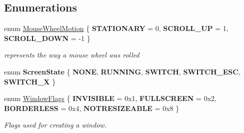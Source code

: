 \subsection*{Enumerations}
\begin{DoxyCompactItemize}
\item 
\mbox{\label{namespacenta_aabafd53ba7264997db9e6e934a8ade2b}} 
enum \hyperlink{namespacenta_aabafd53ba7264997db9e6e934a8ade2b}{Mouse\+Wheel\+Motion} \{ {\bfseries S\+T\+A\+T\+I\+O\+N\+A\+RY} = 0, 
{\bfseries S\+C\+R\+O\+L\+L\+\_\+\+UP} = 1, 
{\bfseries S\+C\+R\+O\+L\+L\+\_\+\+D\+O\+WN} = -\/1
 \}\begin{DoxyCompactList}\small\item\em represents the way a mouse wheel was rolled \end{DoxyCompactList}
\item 
\mbox{\label{namespacenta_a784064b76630398da451dbeffdfc5ad2}} 
enum {\bfseries Screen\+State} \{ \newline
{\bfseries N\+O\+NE}, 
{\bfseries R\+U\+N\+N\+I\+NG}, 
{\bfseries S\+W\+I\+T\+CH}, 
{\bfseries S\+W\+I\+T\+C\+H\+\_\+\+E\+SC}, 
\newline
{\bfseries S\+W\+I\+T\+C\+H\+\_\+X}
 \}
\item 
\mbox{\label{namespacenta_a49cf148a7560d323486d7947b79a43b8}} 
enum \hyperlink{namespacenta_a49cf148a7560d323486d7947b79a43b8}{Window\+Flags} \{ {\bfseries I\+N\+V\+I\+S\+I\+B\+LE} = 0x1, 
{\bfseries F\+U\+L\+L\+S\+C\+R\+E\+EN} = 0x2, 
{\bfseries B\+O\+R\+D\+E\+R\+L\+E\+SS} = 0x4, 
{\bfseries N\+O\+T\+R\+E\+S\+I\+Z\+E\+A\+B\+LE} = 0x8
 \}\begin{DoxyCompactList}\small\item\em Flags used for creating a window. \end{DoxyCompactList}
\end{DoxyCompactItemize}
